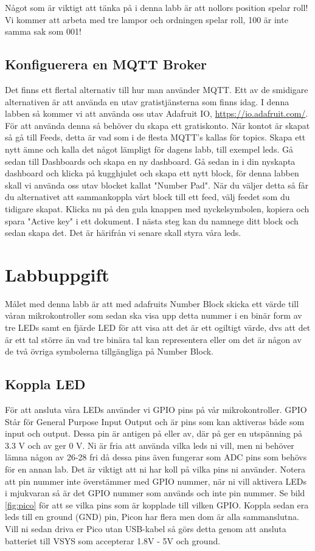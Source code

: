 \documentclass{article}
\begin{document}
Något som är viktigt att tänka på i denna labb är att nollors position spelar roll! Vi kommer att arbeta med tre lampor och ordningen spelar roll, 100 är inte samma sak som 001!

\subsection{Konfiguerera en MQTT Broker}
Det finns ett flertal alternativ till hur man använder MQTT. Ett av de smidigare alternativen är att använda en utav gratistjänsterna som finns idag. I denna labben så kommer vi att använda oss utav Adafruit IO, \url{https://io.adafruit.com/}. För att använda denna så behöver du skapa ett gratiskonto. När kontot är skapat så gå till Feeds, detta är vad som i de flesta MQTT's kallas för topics. Skapa ett nytt ämne och kalla det något lämpligt för dagens labb, till exempel leds. Gå sedan till Dashboards och skapa en ny dashboard. Gå sedan in i din nyskapta dashboard och klicka på kugghjulet och skapa ett nytt block, för denna labben skall vi använda oss utav blocket kallat "Number Pad". När du väljer detta så får du alternativet att sammankoppla vårt block till ett feed, välj feedet som du tidigare skapat. Klicka nu på den gula knappen med nyckelsymbolen, kopiera och spara "Active key" i ett dokument. I nästa steg kan du namnege ditt block och sedan skapa det. Det är härifrån vi senare skall styra våra leds.

\section{Labbuppgift}
Målet med denna labb är att med adafruits Number Block skicka ett värde till våran mikrokontroller som sedan ska visa upp detta nummer i en binär form av tre LEDs samt en fjärde LED för att visa att det är ett ogiltigt värde, dvs att det är ett tal större än vad tre binära tal kan representera eller om det är någon av de två övriga symbolerna tillgängliga på Number Block.

\subsection{Koppla LED}
För att ansluta våra LEDs använder vi GPIO pins på vår mikrokontroller. GPIO Står för General Purpose Input Output och är pins som kan aktiveras både som input och output. Dessa pin är antigen på eller av, där på ger en utspänning på 3.3 V och av ger 0 V. Ni är fria att använda vilka leds ni vill, men ni behöver lämna någon av 26-28 fri då dessa pins även fungerar som ADC pins som behövs för en annan lab. Det är viktigt att ni har koll på vilka pins ni använder. Notera att pin nummer inte överstämmer med GPIO nummer, när ni vill aktivera LEDs i mjukvaran så är det GPIO nummer som används och inte pin nummer. Se bild \ref{fig:pico} för att se vilka pins som är kopplade till vilken GPIO. Koppla sedan era leds till en ground (GND) pin, Picon har flera men dom är alla sammanslutna.
Vill ni sedan driva er Pico utan USB-kabel så görs detta genom att ansluta batteriet till VSYS som accepterar 1.8V - 5V och ground.
\end{document}
